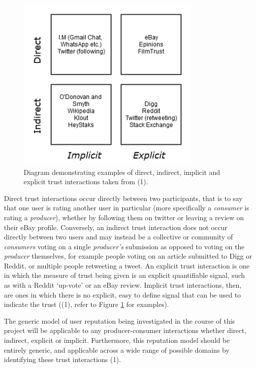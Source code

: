 \documentclass[]{final_report}
\begin{document}
\begin{figure}[ht!]
\centering
\includegraphics[width=90mm]{chap3/trusttypes.png}
\caption{Diagram demonstrating examples of direct, indirect, implicit and explicit trust interactions taken from (1).}
\label{gra:trusttypes}
\end{figure}

Direct trust interactions occur directly between two participants, that is to say that one user is rating another user in particular (more specifically a \textsl{consumer} is rating a \textsl{producer}), whether by following them on twitter or leaving a review on their eBay profile. Conversely, an indirect trust interaction does not occur directly between two users and may instead be a collective or community of \textsl{consumers} voting on a single \textsl{producer's} submission as opposed to voting on the \textsl{producer} themselves, for example people voting on an article submitted to Digg or Reddit, or multiple people retweeting a tweet. An explicit trust interaction is one in which the measure of trust being given is an explicit quantifiable signal, such as with a Reddit `up-vote' or an eBay review. Implicit trust interactions, then, are ones in which there is no explicit, easy to define signal that can be used to indicate the trust ((1), refer to Figure \ref{gra:trusttypes} for examples).

The generic model of user reputation being investigated in the course of this project will be applicable to any producer-consumer interactions whether direct, indirect, explicit or implicit. Furthermore, this reputation model should be entirely generic, and applicable across a wide range of possible domains by identifying these trust interactions (1).
\end{document}
